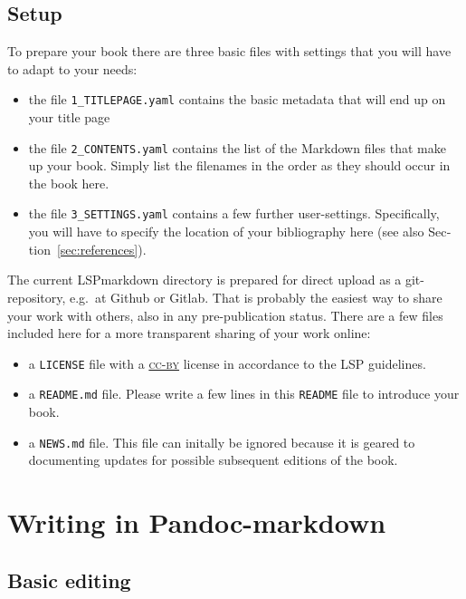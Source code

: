 \hypertarget{setup}{%
\section{Setup}\label{setup}}

To\paragraphnumber{[1.12]} prepare your book there are three basic files
with settings that you will have to adapt to your needs:

\begin{itemize}
\tightlist
\item
  the file \texttt{1\_TITLEPAGE.yaml} contains the basic metadata that
  will end up on your title page
\item
  the file \texttt{2\_CONTENTS.yaml} contains the list of the Markdown
  files that make up your book. Simply list the filenames in the order
  as they should occur in the book here.
\item
  the file \texttt{3\_SETTINGS.yaml} contains a few further
  user-settings. Specifically, you will have to specify the location of
  your bibliography here (see also Sec­tion~\ref{sec:references}).
\end{itemize}

The\paragraphnumber{[1.13]} current LSPmarkdown directory is prepared
for direct upload as a git-repository, e.g.~at Github or Gitlab. That is
probably the easiest way to share your work with others, also in any
pre-publication status. There are a few files included here for a more
transparent sharing of your work online:

\begin{itemize}
\tightlist
\item
  a \texttt{LICENSE} file with a
  \href{https://creativecommons.org/licenses/by/4.0/}{\textsc{cc-by}}
  license in accordance to the LSP guidelines.
\item
  a \texttt{README.md} file. Please write a few lines in this
  \texttt{README} file to introduce your book.
\item
  a \texttt{NEWS.md} file. This file can initally be ignored because it
  is geared to documenting updates for possible subsequent editions of
  the book.
\end{itemize}

\hypertarget{sec:writing}{%
\chapter{Writing in Pandoc-markdown}\label{sec:writing}}

\hypertarget{basic-editing}{%
\section{Basic editing}\label{basic-editing}}

